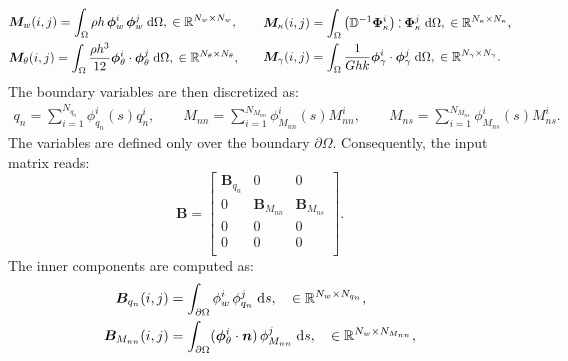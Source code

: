 \documentclass[11t]{article}
\def\onedot{$\mathsurround0pt\ldotp$}
\def\cddot{%
	\mathbin{\vcenter{\baselineskip.67ex
			\hbox{\onedot}\hbox{\onedot}}%
}}
\begin{document}
{\begin{equation}
\begin{gathered}
\begin{aligned}
		&\bm{M}_w(i,j) = \int_{\Omega} \rho h \, \bm{\phi}_w^i \, \bm{\phi}_w^j \d\Omega, \; \in \mathbb{R}^{N_w \times N_w}, \\
		&\bm{M}_\theta(i,j) = \int_{\Omega} \frac{\rho h^3}{12} \bm{\phi}_\theta^i \cdot \bm{\phi}_\theta^j \d\Omega, \; \in \mathbb{R}^{N_\theta \times N_\theta},\\
		\end{aligned} \qquad
		\begin{aligned}
		&\bm{M}_\kappa(i,j) = \int_{\Omega}  \left( \mathbb{D}^{-1} \bm{\Phi}_\kappa^i \right) \cddot \bm{\Phi}_\kappa^j \d\Omega, \; \in \mathbb{R}^{N_\kappa \times N_\kappa},\\
		&\bm{M}_{\gamma}(i,j) = \int_{\Omega} \frac{1}{G h k} \bm{\phi}_{\gamma}^i \cdot \bm{\phi}_{\gamma}^j \d\Omega, \; \in \mathbb{R}^{N_{\gamma} \times N_{\gamma}}. \\
		\end{aligned}
		\end{gathered}
		\end{equation}
		The boundary variables are then discretized as:
		\begin{equation}
		\begin{aligned}
		q_n = \sum_{i = 1}^{N_{q_n}} \phi_{q_n}^i(s) q_n^i, \qquad
		M_{nn} = \sum_{i = 1}^{N_{M_{nn}}} \phi_{M_{nn}}^i(s) M_{nn}^i, \qquad
		M_{ns} = \sum_{i = 1}^{N_{M_{ns}}} \phi_{M_{ns}}^i(s) M_{ns}^i.
		\end{aligned}
		\end{equation}
		The variables are defined only over the boundary $\partial\Omega$. Consequently, the input matrix reads:
		\begin{equation}
		\bm{B} = \begin{bmatrix}
		\bm{B}_{q_n} & 0 & 0 \\
		0 & \bm{B}_{M_{nn}} & \bm{B}_{M_{ns}} \\
		0 & 0 & 0 \\
		0 & 0 & 0 \\
		\end{bmatrix}.
		\end{equation}
		The inner components are computed as:
		\begin{equation}
		\begin{aligned}
		\bm{B}_{q_n}(i,j) &= \int_{\partial\Omega} {\phi}_{w}^i \, {\phi}_{q_n}^j \d{s}, \quad \in \mathbb{R}^{N_w \times N_{q_n}} , \\
		\bm{B}_{M_{nn}}(i,j) &= \int_{\partial\Omega} (\bm{\phi}_{\theta}^i \cdot \bm{n})\, \phi_{M_{nn}}^j \d{s}, \quad \in \mathbb{R}^{N_w \times N_{M_{nn}}} , \\

\end{aligned}
\end{equation}}
\end{document}

